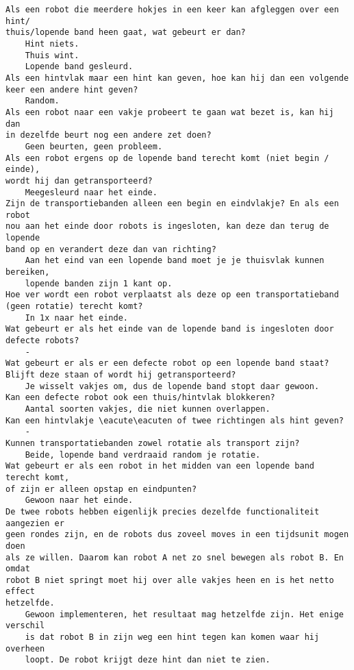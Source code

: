 \lstset{
	tabsize=5,
	basicstyle=\small,
}

\begin{lstlisting}
Als een robot die meerdere hokjes in een keer kan afgleggen over een hint/
thuis/lopende band heen gaat, wat gebeurt er dan?
	Hint niets.
	Thuis wint.
	Lopende band gesleurd.
Als een hintvlak maar een hint kan geven, hoe kan hij dan een volgende 
keer een andere hint geven?
	Random.
Als een robot naar een vakje probeert te gaan wat bezet is, kan hij dan 
in dezelfde beurt nog een andere zet doen?
	Geen beurten, geen probleem.
Als een robot ergens op de lopende band terecht komt (niet begin / einde), 
wordt hij dan getransporteerd?
	Meegesleurd naar het einde.
Zijn de transportiebanden alleen een begin en eindvlakje? En als een robot 
nou aan het einde door robots is ingesloten, kan deze dan terug de lopende 
band op en verandert deze dan van richting?
	Aan het eind van een lopende band moet je je thuisvlak kunnen bereiken, 
	lopende banden zijn 1 kant op.
Hoe ver wordt een robot verplaatst als deze op een transportatieband 
(geen rotatie) terecht komt? 
	In 1x naar het einde.
Wat gebeurt er als het einde van de lopende band is ingesloten door 
defecte robots?
	-
Wat gebeurt er als er een defecte robot op een lopende band staat? 
Blijft deze staan of wordt hij getransporteerd?
	Je wisselt vakjes om, dus de lopende band stopt daar gewoon.
Kan een defecte robot ook een thuis/hintvlak blokkeren?
	Aantal soorten vakjes, die niet kunnen overlappen.
Kan een hintvlakje \eacute\eacuten of twee richtingen als hint geven?
	-
Kunnen transportatiebanden zowel rotatie als transport zijn?
	Beide, lopende band verdraaid random je rotatie.
Wat gebeurt er als een robot in het midden van een lopende band terecht komt, 
of zijn er alleen opstap en eindpunten?
	Gewoon naar het einde.
De twee robots hebben eigenlijk precies dezelfde functionaliteit aangezien er 
geen rondes zijn, en de robots dus zoveel moves in een tijdsunit mogen doen 
als ze willen. Daarom kan robot A net zo snel bewegen als robot B. En omdat 
robot B niet springt moet hij over alle vakjes heen en is het netto effect 
hetzelfde.
	Gewoon implementeren, het resultaat mag hetzelfde zijn. Het enige verschil 
	is dat robot B in zijn weg een hint tegen kan komen waar hij overheen 
	loopt. De robot krijgt deze hint dan niet te zien.

\end{lstlisting}
